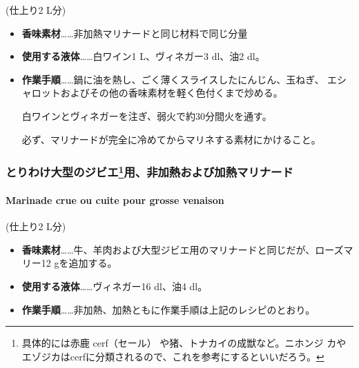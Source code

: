 \begin{recette}
(仕上り2 L分)

\begin{itemize}
\item
  \textbf{香味素材}\ldots{}\ldots{}非加熱マリナードと同じ材料で同じ分量
\item
  \textbf{使用する液体}\ldots{}\ldots{}白ワイン1\undemi{} L、ヴィネガー3
  dl、油2\undemi{} dl。
\item
  \textbf{作業手順}\ldots{}\ldots{}鍋に油を熱し、ごく薄くスライスしたにんじん、玉ねぎ、
  エシャロットおよびその他の香味素材を軽く色付くまで炒める。

  白ワインとヴィネガーを注ぎ、弱火で約30分間火を通す。

  必ず、マリナードが完全に冷めてからマリネする素材にかけること。
\end{itemize}

\maeaki

\hypertarget{toriwake-oogatano-jibieyou-hikanetsu-oyobi-kanetsu-marinade}{%
\subsubsection[とりわけ大型のジビエ用、非加熱および加熱マリナード]{\texorpdfstring{とりわけ大型のジビエ\footnote{具体的には赤鹿
  cerf（セール） や猪、トナカイの成獣など。ニホンジ
  カやエゾジカはcerfに分類されるので、これを参考にするといいだろう。}用、非加熱および加熱マリナード}{とりわけ大型のジビエ用、非加熱および加熱マリナード}}\label{toriwake-oogatano-jibieyou-hikanetsu-oyobi-kanetsu-marinade}}

\hypertarget{marinade-crue-ou-cuite-pour-grosse-venaison}{%
\paragraph{Marinade crue ou cuite pour grosse
venaison}\label{marinade-crue-ou-cuite-pour-grosse-venaison}}


(仕上り2 L分)

\begin{itemize}
\item
  \textbf{香味素材}\ldots{}\ldots{}牛、羊肉および大型ジビエ用のマリナードと同じだが、ローズマリー12
  gを追加する。
\item
  \textbf{使用する液体}\ldots{}\ldots{}ヴィネガー16 dl、油4 dl。
\item
  \textbf{作業手順}\ldots{}\ldots{}非加熱、加熱ともに作業手順は上記のレシピのとおり。
\end{itemize}


\end{recette}
